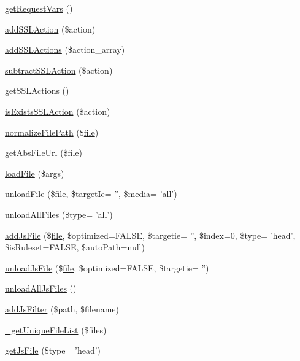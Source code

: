 \begin{DoxyCompactItemize}
\hyperlink{classContext_a9ddbc79a7ba5892d1ea2d793f6ad52c2}{get\+Request\+Vars} ()
\item 
\hyperlink{classContext_a781f5e7a057e6f0992310318a0339ae8}{add\+S\+S\+L\+Action} (\$action)
\item 
\hyperlink{classContext_ab2acd5415515b232b7cf9f0130f4efa3}{add\+S\+S\+L\+Actions} (\$action\+\_\+array)
\item 
\hyperlink{classContext_a598cb5c571c0a1ffb15f67064e251f0d}{subtract\+S\+S\+L\+Action} (\$action)
\item 
\hyperlink{classContext_a10b68bdba6f55bc725c352aad7844dc7}{get\+S\+S\+L\+Actions} ()
\item 
\hyperlink{classContext_ada5b689e4d143f371c38091b87cfd864}{is\+Exists\+S\+S\+L\+Action} (\$action)
\item 
\hyperlink{classContext_a47a8a7878385f0d5cb7085f933157128}{normalize\+File\+Path} (\$\hyperlink{classfile}{file})
\item 
\hyperlink{classContext_a217a7ff0e32178c6a2cc761de9c88998}{get\+Abs\+File\+Url} (\$\hyperlink{classfile}{file})
\item 
\hyperlink{classContext_a01ddbd076a74f16dc46d3c7b358daea6}{load\+File} (\$args)
\item 
\hyperlink{classContext_afab39232525ca876120253feee0fe3a1}{unload\+File} (\$\hyperlink{classfile}{file}, \$target\+Ie= '', \$media= 'all')
\item 
\hyperlink{classContext_a9125192700ddd7a2234f34a192165902}{unload\+All\+Files} (\$type= 'all')
\item 
\hyperlink{classContext_a69807c3ced3f97920b233a3fce3bb492}{add\+Js\+File} (\$\hyperlink{classfile}{file}, \$optimized=F\+A\+L\+S\+E, \$targetie= '', \$index=0, \$type= 'head', \$is\+Ruleset=F\+A\+L\+S\+E, \$auto\+Path=null)
\item 
\hyperlink{classContext_ac5016f24f0bd279096d3f0cd0c0df5a9}{unload\+Js\+File} (\$\hyperlink{classfile}{file}, \$optimized=F\+A\+L\+S\+E, \$targetie= '')
\item 
\hyperlink{classContext_ac8ac4c21583b50815eb01d9cc4f6405f}{unload\+All\+Js\+Files} ()
\item 
\hyperlink{classContext_ae93f59a2ffac5a3074acd304d10ad7b3}{add\+Js\+Filter} (\$path, \$filename)
\item 
\hyperlink{classContext_a8bde0f7d77424555f9b856664b59e0bc}{\+\_\+get\+Unique\+File\+List} (\$files)
\item 
\hyperlink{classContext_aa3844fdfe0768191c5cef3aef8db1115}{get\+Js\+File} (\$type= 'head')

\end{DoxyCompactItemize}
